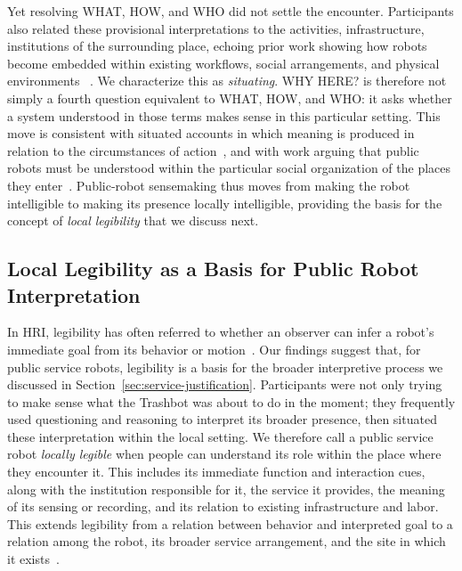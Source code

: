Yet resolving WHAT, HOW, and WHO did not settle the encounter. Participants also related these provisional interpretations to the activities, infrastructure, institutions of the surrounding place, echoing prior work showing how robots become embedded within existing workflows, social arrangements, and physical environments ~\cite{mutlu2008robots}. We characterize this as \emph{situating}. WHY HERE? is therefore not simply a fourth question equivalent to WHAT, HOW, and WHO: it asks whether a system understood in those terms makes sense in this particular setting. This move is consistent with situated accounts in which meaning is produced in relation to the circumstances of action~\cite{suchman1987plans}, and with work arguing that public robots must be understood within the particular social organization of the places they enter~\cite{pelikan2025localism,bu2025making}. Public-robot sensemaking thus moves from making the robot intelligible to making its presence locally intelligible, providing the basis for the concept of \emph{local legibility} that we discuss next.

\subsection{Local Legibility as a Basis for Public Robot Interpretation}
\label{sec:local-legibility}

In HRI, legibility has often referred to whether an observer can infer a robot's immediate goal from its behavior or motion~\cite{dragan2013legibility}. Our findings suggest that, for public service robots, legibility is a basis for the broader interpretive process we discussed in Section~\ref{sec:service-justification}. Participants were not only trying to make sense what the Trashbot was about to do in the moment; they frequently used questioning and reasoning to interpret its broader presence, then situated these interpretation within the local setting. We therefore call a public service robot \emph{locally legible} when people can understand its role within the place where they encounter it. This includes its immediate function and interaction cues, along with the institution responsible for it, the service it provides, the meaning of its sensing or recording, and its relation to existing infrastructure and labor. This extends legibility from a relation between behavior and interpreted goal to a relation among the robot, its broader service arrangement, and the site in which it exists~\cite{while2021urban}.

